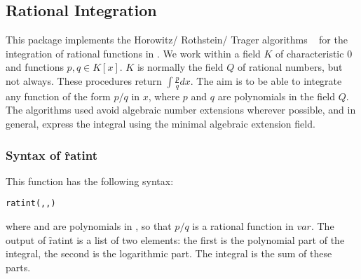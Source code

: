  

\newcommand{\logsum}{\mathop{\mathrm{log\_sum}}}

\subsection{Rational Integration}

This package implements the Horowitz/ Rothstein/ Trager algorithms ~\cite{Geddes:92} for the integration of rational functions in \REDUCE. We work within a field $K$ of characteristic $0$ and functions $p,q \in K[x]$. $K$ is normally the field $Q$ of rational numbers, but not always. These procedures return $\int \frac{p}{q} dx.$
 The aim is to be able to integrate any function of the form $p/q$ in $x$, where $p$ and $q$ are polynomials in the field $Q$. The algorithms used avoid algebraic number extensions wherever possible, and in general, express the integral using the minimal algebraic extension field.

 \subsubsection{Syntax of \f{ratint}}
 \hypertarget{operator:RATINT}{}
This function has the following syntax:
\begin{syntax}
  \texttt{ratint(,,)}
\end{syntax}
where  and  are polynomials in , so that $p/q$ is a rational function in $var$.
The output of \f{ratint} is a list of two elements: the first is the polynomial part of the integral, the second is the logarithmic part. The integral is the sum of these parts.

